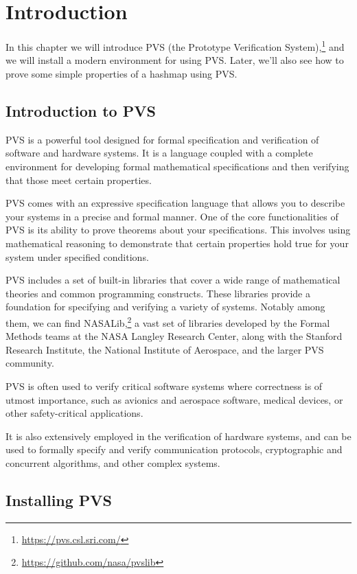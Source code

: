 \chapter{Introduction}

In this chapter we will introduce PVS (the Prototype Verification System),\footnote{%
	\url{https://pvs.csl.sri.com/}
} and we will install a modern environment for using PVS.
Later, we'll also see how to prove some simple properties of a hashmap using PVS.


\section{Introduction to PVS}

PVS is a powerful tool designed for formal specification and verification of software and hardware systems.
It is a language coupled with a complete environment for developing formal mathematical specifications and then verifying that those meet certain properties.

PVS comes with an expressive specification language that allows you to describe your systems in a precise and formal manner.
One of the core functionalities of PVS is its ability to prove theorems about your specifications.
This involves using mathematical reasoning to demonstrate that certain properties hold true for your system under specified conditions.

PVS includes a set of built-in libraries that cover a wide range of mathematical theories and common programming constructs. 
These libraries provide a foundation for specifying and verifying a variety of systems.
Notably among them, we can find NASALib,\footnote{%
	\url{https://github.com/nasa/pvslib}
} a vast set of libraries developed by the Formal Methods teams at the NASA Langley Research Center, along with the Stanford Research Institute, the National Institute of Aerospace, and the larger PVS community.

PVS is often used to verify critical software systems where correctness is of utmost importance, such as avionics and aerospace software, medical devices, or other safety-critical applications.

It is also extensively employed in the verification of hardware systems, and can be used to formally specify and verify communication protocols, cryptographic and concurrent algorithms, and other complex systems.


\section{Installing PVS}

